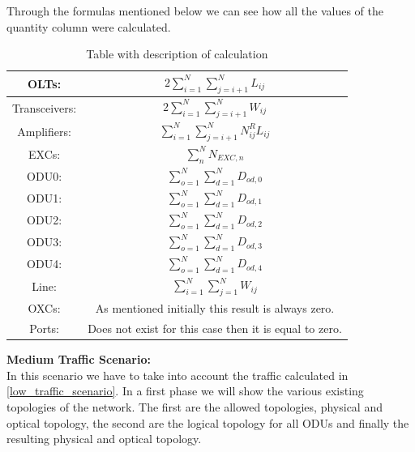 Through the formulas mentioned below we can see how all the values of the quantity column were calculated.

\begin{table}[H]
\centering
\begin{tabular}{|| c | c ||}
 \hline
 OLTs: & \(\displaystyle 2 \sum_{i=1}^{N}\sum_{j=i+1}^{N} L_{ij} \) \\ \hline
 Transceivers: & \(\displaystyle 2 \sum_{i=1}^{N}\sum_{j=i+1}^{N} W_{ij} \) \\ \hline
 Amplifiers: & \(\displaystyle \sum_{i=1}^{N}\sum_{j=i+1}^{N} N^R_{ij} L_{ij} \) \\ \hline
 EXCs: & \(\displaystyle \sum_n^N N_{EXC,n} \) \\ \hline
 ODU0: & \(\displaystyle \sum_{o=1}^{N}\sum_{d=1}^{N} D_{od,0} \) \\ \hline
 ODU1: & \(\displaystyle \sum_{o=1}^{N}\sum_{d=1}^{N} D_{od,1} \) \\ \hline
 ODU2: & \(\displaystyle \sum_{o=1}^{N}\sum_{d=1}^{N} D_{od,2} \)\\ \hline
 ODU3: & \(\displaystyle \sum_{o=1}^{N}\sum_{d=1}^{N} D_{od,3} \) \\ \hline
 ODU4: & \(\displaystyle \sum_{o=1}^{N}\sum_{d=1}^{N} D_{od,4} \) \\ \hline
 Line: & \(\displaystyle \sum_{i=1}^{N}\sum_{j=1}^{N} W_{ij} \) \\ \hline
 OXCs: & As mentioned initially this result is always zero. \\ \hline
 Ports: & Does not exist for this case then it is equal to zero. \\
 \hline
 \end{tabular}
\caption{Table with description of calculation}
\label{formulas_opaque_protec_ref_low_heuristic}
\end{table}

\newpage
\textbf{Medium Traffic Scenario:}\\

In this scenario we have to take into account the traffic calculated in \ref{low_traffic_scenario}. In a first phase we will show the various existing topologies of the network. The first are the allowed topologies, physical and optical topology, the second are the logical topology for all ODUs and finally the resulting physical and optical topology.\\

